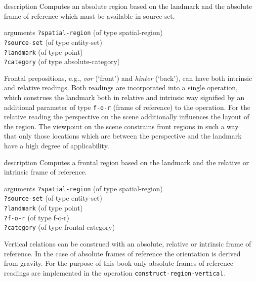 \begin{explanation}{description}
Computes an absolute region based on the landmark
and the absolute frame of reference which must be available
in source set.
\end{explanation}
\begin{explanation}{arguments}
{\footnotesize\verb+?spatial-region+} (of type spatial-region) \\
{\footnotesize\verb+?source-set+} (of type entity-set) \\
{\footnotesize\verb+?landmark+} (of type point)\\
{\footnotesize\verb+?category+} (of type absolute-category)
\vspace{0.3cm}
\end{explanation}

Frontal prepositions, e.g., \textit{vor} (`front') and \textit{hinter} (`back'), can have
both intrinsic and relative readings. Both readings are incorporated
into a single operation, which construes the landmark both
in relative and intrinsic way signified by an additional parameter
of type {\footnotesize\tt f-o-r} (frame of reference) to the operation.
For the relative reading the perspective on the scene additionally
influences the layout of the region. The viewpoint on
the scene constrains front regions in such a way that
only those locations which are between the perspective and
the landmark have a high degree of applicability.

\begin{explanation}{description}
Computes a frontal region based on the landmark
and the relative or intrinsic frame of reference.
\end{explanation}
\begin{explanation}{arguments}
{\footnotesize\verb+?spatial-region+} (of type spatial-region) \\
{\footnotesize\verb+?source-set+} (of type entity-set) \\
{\footnotesize\verb+?landmark+} (of type point)\\
{\footnotesize\verb+?f-o-r+} (of type f-o-r)\\
{\footnotesize\verb+?category+} (of type frontal-category)
\vspace{0.3cm}
\end{explanation}

Vertical relations can be construed with an absolute, relative
or intrinsic frame of reference. In the case of absolute frames
of reference the orientation is derived from gravity. For the purpose
of this book only absolute frames of reference readings are
implemented in the operation {\footnotesize\tt construct-region-vertical}.


